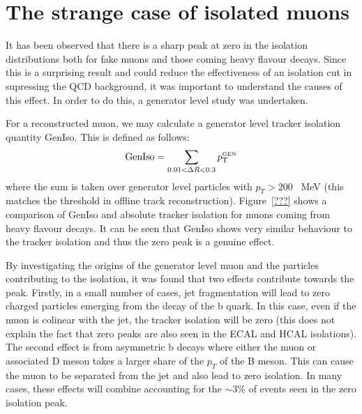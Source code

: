 \section{The strange case of isolated muons}
\label{app:isomuons}

It has been observed that there is a sharp peak at zero in the isolation
distributions both for fake muons and those coming heavy flavour decays. Since
this is a surprising result and could reduce the effectiveness of an isolation
cut in supressing the QCD background, it was important to understand the causes
of this effect. In order to do this, a generator level study was undertaken.

For a reconstructed muon, we may calculate a generator level tracker isolation
quantity GenIso. This is defined as follows:
\begin{equation}
\textrm{GenIso}=\sum_{0.01<\Delta R <0.3}p_{\textrm{T}}^{\textrm{\tiny{GEN}}}
\end{equation}
where the sum is taken over generator level particles with $p_T > 200$~ MeV
(this matches the threshold in offline track reconstruction). Figure~\ref{???}
shows a comparison of GenIso and absolute tracker isolation for muons coming
from heavy flavour decays. It can be seen that GenIso shows very similar
behaviour to the tracker isolation and thus the zero peak is a genuine effect. 

By investigating the origins of the generator level muon and the particles
contributing to the isolation, it was found that two effects contribute towards
the peak. Firstly, in a small number of cases, jet fragmentation will lead to
zero charged particles emerging from the decay of the b quark. In this case,
even if the muon is colinear with the jet, the tracker isolation will be zero
(this does not explain the fact that zero peaks are also seen in the ECAL and
HCAL isolations). The second effect is from asymmetric b decays where either the
muon or associated D meson takes a larger share of the $p_T$ of the B
meson. This can cause the muon to be separated from the jet and also lead to
zero isolation. In many cases, these effects will combine accounting for the
$\sim 3$\% of events seen in the zero isolation peak.
